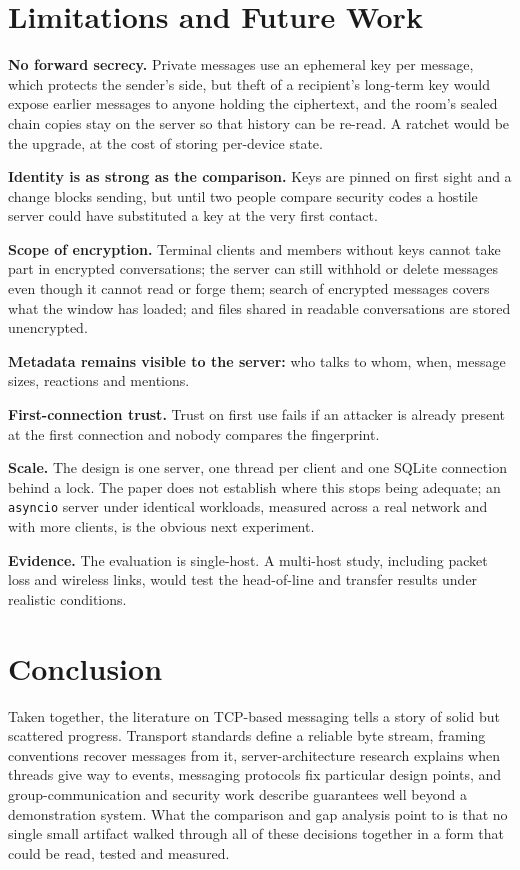 \documentclass[conference]{IEEEtran}
\newcommand{\code}[1]{\texttt{#1}}
\begin{document}
\section{Limitations and Future Work}
\textbf{No forward secrecy.} Private messages use an ephemeral key per message, which protects the sender's side, but theft of a recipient's long-term key would expose earlier messages to anyone holding the ciphertext, and the room's sealed chain copies stay on the server so that history can be re-read. A ratchet \cite{signal,cohngordon} would be the upgrade, at the cost of storing per-device state.

\textbf{Identity is as strong as the comparison.} Keys are pinned on first sight and a change blocks sending, but until two people compare security codes a hostile server could have substituted a key at the very first contact.

\textbf{Scope of encryption.} Terminal clients and members without keys cannot take part in encrypted conversations; the server can still withhold or delete messages even though it cannot read or forge them; search of encrypted messages covers what the window has loaded; and files shared in readable conversations are stored unencrypted.

\textbf{Metadata remains visible to the server:} who talks to whom, when, message sizes, reactions and mentions.

\textbf{First-connection trust.} Trust on first use fails if an attacker is already present at the first connection and nobody compares the fingerprint.

\textbf{Scale.} The design is one server, one thread per client and one SQLite connection behind a lock. The paper does not establish where this stops being adequate; an \code{asyncio} server \cite{pyasyncio} under identical workloads, measured across a real network and with more clients, is the obvious next experiment.

\textbf{Evidence.} The evaluation is single-host. A multi-host study, including packet loss and wireless links, would test the head-of-line and transfer results under realistic conditions.

\section{Conclusion}
Taken together, the literature on TCP-based messaging tells a story of solid but scattered progress. Transport standards define a reliable byte stream, framing conventions recover messages from it, server-architecture research explains when threads give way to events, messaging protocols fix particular design points, and group-communication and security work describe guarantees well beyond a demonstration system. What the comparison and gap analysis point to is that no single small artifact walked through all of these decisions together in a form that could be read, tested and measured.
\end{document}
